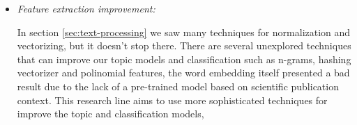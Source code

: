 \begin{itemize}

	\item \textit{Feature extraction improvement:}
	
	In section \ref{sec:text-processing} we saw many techniques for normalization and vectorizing, but it doesn't stop there. There are several unexplored techniques that can improve our topic models and classification such as n-grams, hashing vectorizer and polinomial features, the word embedding itself presented a bad result due to the lack of a pre-trained model based on scientific publication context. This research line aims to use more sophisticated techniques for improve the topic and classification models, 
	
	
\end{itemize}
